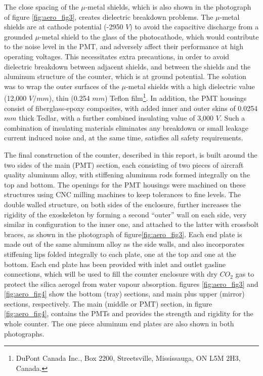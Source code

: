The close spacing of the $\mu$-metal shields, which is also shown in the
photograph of figure \ref{fig:aero_fig3}, creates dielectric breakdown problems.  The $\mu$-metal
shields are at cathode potential (-2950 $V$) to avoid the capacitive discharge
from a grounded $\mu$-metal shield to the glass of the photocathode, which
would contribute to the noise level in the PMT, and adversely affect their
performance at high operating voltages. This necessitates extra precautions, in
order to avoid dielectric breakdown between adjacent shields, and between the
shields and the aluminum structure of the counter, which is at ground
potential. The solution was to wrap the outer surfaces of the $\mu$-metal
shields with a high dielectric value (12,000 $V/mm$), thin (0.254 $mm$) Teflon
film\footnote{DuPont Canada Inc., Box 2200, Streetsville, Mississauga, ON L5M 2H3, Canada.}.
  In addition, the PMT housings consist of fiberglass-epoxy
composites, with added inner and outer skins of 0.0254 $mm$ thick 
Tedlar\footnotemark[1],
with a further combined insulating value of 3,000 $V$.  Such a
combination of insulating materials eliminates any breakdown or small leakage
current induced noise and, at the same time, satisfies all safety requirements.

The final construction of the counter, described in this report, is built
around the two sides of the main (PMT) section, each consisting of two pieces
of aircraft quality aluminum alloy, with stiffening aluminum rods formed
integrally on the top and bottom.  The openings for the PMT housings were
machined on these structures using CNC milling machines to keep tolerances to
fine levels.  The double walled structure, on both sides of the enclosure,
further increases the rigidity of the exoskeleton by forming a second ``outer''
wall on each side, very similar in configuration to the inner one, and attached
to the latter with crossbolt braces, as shown in the photograph of
figure\ref{fig:aero_fig3}.
Each end plate is made out of the same aluminum alloy as the side walls, and
also incorporates stiffening lips folded integrally to each plate, one at the
top and one at the bottom.  Each end plate has been provided with inlet and
outlet gasline connections, which will be used to fill the counter enclosure
with dry $CO_2$ gas to protect the silica aerogel from water vapour absorption.
figures \ref{fig:aero_fig3} and \ref{fig:aero_fig4} show the bottom (tray) sections, 
and main plus upper (mirror)
sections, respectively.  The main (middle or PMT) section, in
figure \ref{fig:aero_fig4},
contains the PMTs and provides the strength and rigidity for the whole counter.
The one piece aluminum end plates are also shown in both photographs. 

